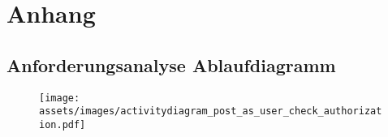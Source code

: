 
\chapter{Anhang} %
\label{cha:anhang}

\section{Anforderungsanalyse Ablaufdiagramm} %
\label{sec:anforderungsanalyse_ablaufdiagramm}

\begin{figure}[h]
     \texttt{[image: assets/images/activitydiagram\_post\_as\_user\_check\_authorization.pdf]}
    \label{fig:anhang_anforderungsanalyse_ablaufdiagramm}
\end{figure}



